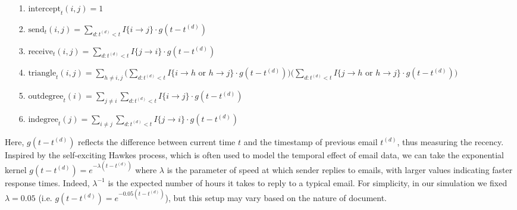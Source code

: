 \documentclass[a4paper]{article}
\begin{document}
\begin{itemize}[leftmargin=*,rightmargin=-1cm]
\item [1.] $\mbox{intercept}_t(i, j) = 1$
\item [2.]  $\mbox{send}_t(i, j)=\sum\limits_{d: t^{(d)}<t} I\{i\rightarrow j\}\cdot g(t-t^{(d)})$
\item [3.] $\mbox{receive}_t(i, j)=\sum\limits_{d: t^{(d)}<t} I\{j\rightarrow i\}\cdot g(t-t^{(d)})$
\item [4.] $\mbox{triangle}_t(i, j)=\sum\limits_{h \neq i, j}\Big(\sum\limits_{d: t^{(d)}<t}  I\{i\rightarrow h \mbox{ or } h\rightarrow j \}\cdot g(t-t^{(d)})\Big)\Big(\sum\limits_{d: t^{(d)}<t} I\{j\rightarrow h \mbox{ or } h\rightarrow j\}\cdot g(t-t^{(d)})\Big)$
\item [5.]  $\mbox{outdegree}_t(i)=\sum\limits_{j\neq i}\sum\limits_{d: t^{(d)}<t} I\{i\rightarrow j\}\cdot g(t-t^{(d)})$
\item [6.] $\mbox{indegree}_t(j)=\sum\limits_{i \neq j}\sum\limits_{d: t^{(d)}<t} I\{j\rightarrow i\}\cdot g(t-t^{(d)})$
\end{itemize}
Here, $g(t-t^{(d)})$ reflects the difference between current time $t$ and the timestamp of previous email $t^{(d)}$, thus measuring the recency. Inspired by the self-exciting Hawkes process, which is often used to model the temporal effect of email data, we can take the exponential kernel $g(t-t^{(d)})=e^{-\lambda(t-t^{(d)})}$ where $\lambda$ is the parameter of speed at
which sender replies to emails, with larger values indicating faster response times. Indeed, $\lambda^{-1}$ is the expected number of hours it takes to reply to a typical email. For simplicity, in our simulation we fixed $\lambda=0.05$ (i.e. $g(t-t^{(d)})=e^{-0.05(t-t^{(d)})}$), but this setup may vary based on the nature of document.
\end{document}
